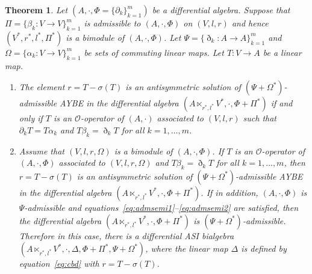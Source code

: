 \documentclass[pdftex]{sigma}
\numberwithin{equation}{section}
\newtheorem{Theorem}{Theorem}[section]
\begin{document}
\begin{Theorem}\label{thm:aybesemi}
 Let $(A, \cdot, \Phi = \{\partial_k\}_{k=1}^m)$ be a differential algebra.
 Suppose that $\Pi = \{\beta_k\colon V \to V\}_{k=1}^m$ is admissible to $(A, \cdot, \Phi)$ on $(V, l, r)$ and
 hence $(V^*, r^*, l^*, \Pi^*)$ is a bimodule of $(A, \cdot, \Phi)$.
 Let $\Psi = \{\eth_k\colon A \to A\}_{k=1}^m$ and $\Omega = \{\alpha_k\colon V \to V\}_{k=1}^m$ be sets of commuting linear maps.
 Let $T\colon V \to A$ be a linear map.
 \begin{enumerate}\itemsep=0pt
 \item[$1.$] The element $r = T - \sigma(T)$ is an antisymmetric solution of $(\Psi + \Omega^*)$-admissible AYBE in the differential algebra $(A \ltimes_{r^*, l^*}V^*, \cdot, \Phi + \Pi^*)$
 if and only if $T$ is an $\mathcal{O}$-operator of $(A, \cdot)$ associated to $(V, l, r)$ such that $\partial_k T = T \alpha_k$ and $T \beta_k = \eth_k T$ for all $k=1,\dots,m$.

 \item[$2.$] Assume that $(V, l, r, \Omega)$ is a bimodule of $(A, \cdot, \Phi)$.
 If $T$ is an $\mathcal{O}$-operator of $(A, \cdot, \Phi)$ associated to $(V, l, r,\Omega)$ and $T \beta_k = \eth_k T$ for all $k=1, \dots, m$,
 then $r = T - \sigma(T)$ is an antisymmetric solution of $(\Psi + \Omega^*)$-admissible AYBE in the differential algebra $(A \ltimes_{r^*, l^*} V^*, \cdot, \Phi + \Pi^*)$.
 If in addition, $(A, \cdot, \Phi)$ is $\Psi$-admissible and equations~\eqref{eq:admsemi1}--\eqref{eq:admsemi2} are satisfied,
 then the differential algebra $(A \ltimes_{r^*, l^*} V^*, \cdot, \Phi + \Pi^*)$ is $(\Psi + \Omega^*)$-admissible.
 Therefore in this case,
 there is a differential ASI bialgebra $(A \ltimes_{r^*, l^*} V^*, \cdot, \Delta, \Phi + \Pi^*, \Psi + \Omega^*)$,
 where the linear map $\Delta$ is defined by
 equation~\eqref{eq:cbd} with $r=T-\sigma(T)$.
\end{enumerate}
\end{Theorem}
\end{document}
